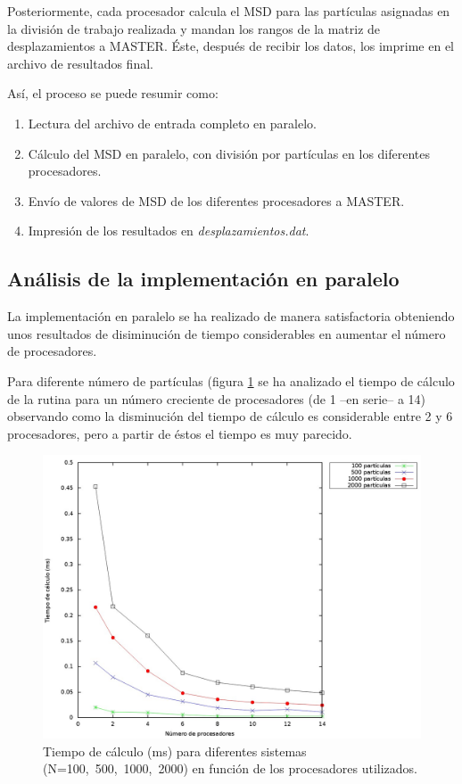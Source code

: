 \documentclass[onecolumn]{article}
\renewcommand{\it}[1]{\textit{#1}}
\begin{document}
Posteriormente, cada procesador calcula el MSD para las partículas asignadas en la división de trabajo realizada y mandan los rangos de la matriz de desplazamientos a MASTER. Éste, después de recibir los datos, los imprime en el archivo de resultados final.

Así, el proceso se puede resumir como:
\begin{enumerate}
\item Lectura del archivo de entrada completo en paralelo.
\item Cálculo del MSD en paralelo, con división por partículas en los diferentes procesadores.
\item Envío de valores de MSD de los diferentes procesadores a MASTER.
\item Impresión de los resultados en \it{desplazamientos.dat}.
\end{enumerate}

\subsection{Análisis de la implementación en paralelo}
La implementación en paralelo se ha realizado de manera satisfactoria obteniendo unos resultados de disiminución de tiempo considerables en aumentar el número de procesadores.

Para diferente número de partículas (figura \ref{fig: comparacion cores alberto} se ha analizado el tiempo de cálculo de la rutina para un número creciente de procesadores (de 1 --en serie-- a 14) observando como la disminución del tiempo de cálculo es considerable entre 2 y 6 procesadores, pero a partir de éstos el tiempo es muy parecido.
\begin{figure}
\includegraphics[scale=0.25]{velos_calc_alberto.jpeg} 
\caption{Tiempo de cálculo (ms) para diferentes sistemas (N=100,\ 500,\ 1000,\ 2000) en función de los procesadores utilizados.} 
\label{fig: comparacion cores alberto}
\end{figure}
\end{document}
